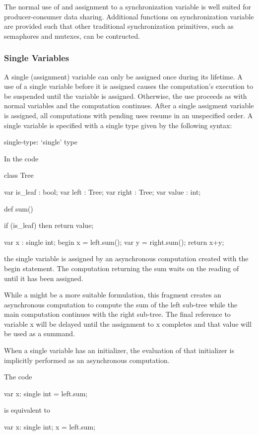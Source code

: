 The normal use of and assignment to a synchronization variable is well
suited for producer-consumer data sharing.  Additional functions on
synchronization variable are provided such that other traditional
synchronization primitives, such as semaphores and mutexes, can be
contructed.

\subsubsection{Single Variables}
\label{Single_Variables}

A single (assignment) variable can only be assigned once during its
lifetime.  A use of a single variable before it is assigned causes the
computation's execution to be suspended until the variable is
assigned. Otherwise, the use proceeds as with normal variables and the
computation continues.  After a single assigment variable is assigned,
all computations with pending uses resume in an unspecified order.  A
single variable is specified with a single type given by the following
syntax:
\begin{syntax}
 single-type:
   `single' type
\end{syntax}

\begin{example}
In the code
\begin{chapel}
class Tree {
  var is_leaf : bool;
  var left    : Tree;
  var right   : Tree;
  var value   : int;

  def sum() {
    if (is_leaf) then 
       return value;

    var x : single int;
    begin x = left.sum();
    var y = right.sum();
    return x+y;
  }
}
\end{chapel}
the single variable  is assigned by an asynchronous
computation created with the begin statement. The computation
returning the sum waits on the reading of  until it has been
assigned.

While a  might be a more suitable formulation, this
fragment creates an asynchronous computation to compute the sum of the
left sub-tree while the main computation continues with the right
sub-tree. The final reference to variable x will be delayed until the
assignment to x completes and that value will be used as a summand.
\end{example}

When a single variable has an initializer, the evaluation of
that initializer is implicitly performed as an asynchronous computation. 
\begin{example}
The code
\begin{chapel}
var x: single int = left.sum;
\end{chapel}
is equivalent to
\begin{chapel}
var x: single int;
x = left.sum;
\end{chapel}
\end{example}

